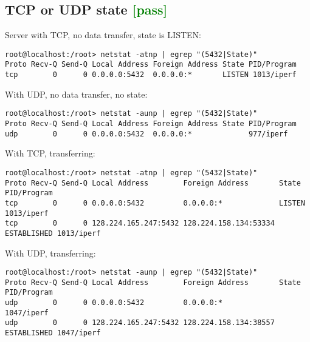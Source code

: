 \documentclass[a4paper]{report}
\begin{document}
\subsection{TCP or UDP state \textcolor{green}{[pass]}}
Server with TCP, no data transfer, state is LISTEN:
\begin{lstlisting}
root@localhost:/root> netstat -atnp | egrep "(5432|State)"
Proto Recv-Q Send-Q Local Address Foreign Address State PID/Program
tcp        0      0 0.0.0.0:5432  0.0.0.0:*       LISTEN 1013/iperf
\end{lstlisting}
With UDP, no data transfer, no state:
\begin{lstlisting}
root@localhost:/root> netstat -aunp | egrep "(5432|State)"
Proto Recv-Q Send-Q Local Address Foreign Address State PID/Program
udp        0      0 0.0.0.0:5432  0.0.0.0:*             977/iperf
\end{lstlisting}
With TCP, transferring:
\begin{lstlisting}
root@localhost:/root> netstat -atnp | egrep "(5432|State)"
Proto Recv-Q Send-Q Local Address        Foreign Address       State       PID/Program
tcp        0      0 0.0.0.0:5432         0.0.0.0:*             LISTEN      1013/iperf
tcp        0      0 128.224.165.247:5432 128.224.158.134:53334 ESTABLISHED 1013/iperf
\end{lstlisting}
With UDP, transferring:
\begin{lstlisting}
root@localhost:/root> netstat -aunp | egrep "(5432|State)"
Proto Recv-Q Send-Q Local Address        Foreign Address       State       PID/Program
udp        0      0 0.0.0.0:5432         0.0.0.0:*                         1047/iperf
udp        0      0 128.224.165.247:5432 128.224.158.134:38557 ESTABLISHED 1047/iperf
\end{lstlisting}
\end{document}
